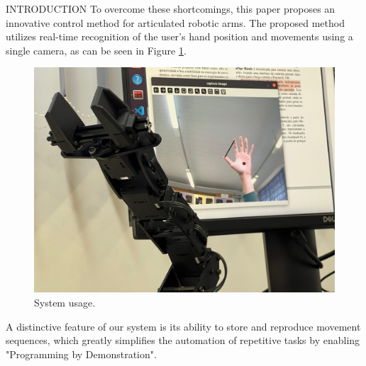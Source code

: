 \documentclass[%
  final,%
  english,%
  english,%
]{beamer}
\begin{document}
\begin{frame}[t, fragile = singleslide]
\begin{columns}[t, onlytextwidth]
\begin{column}{0.49\textwidth}
\begin{block}{INTRODUCTION}
To overcome these shortcomings, this paper proposes an innovative control method for articulated robotic arms. The proposed method utilizes real-time recognition of the user's hand position and movements using a single camera, as can be seen in Figure \ref{fig:uso_do_sistema}.

\vspace{-0.15cm}
\begin{figure}[!htb]
    \centering
    \includegraphics[scale=0.15]{Figuras/hand_and_robot.jpeg}
    \caption{System usage.}
    \label{fig:uso_do_sistema}
\end{figure}

A distinctive feature of our system is its ability to store and reproduce movement sequences, which greatly simplifies the automation of repetitive tasks by enabling "Programming by Demonstration".

\end{block}
% 



\end{column}
\end{columns}
\end{frame}
\end{document}
